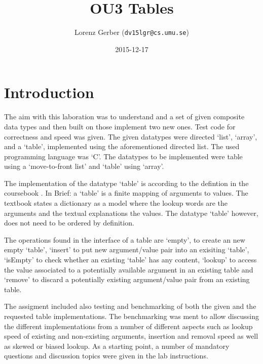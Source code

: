 \documentclass[a4paper,11pt,twoside]{article}
\title{OU3 Tables}
\author{Lorenz Gerber  ({\tt{dv15lgr@cs.umu.se}})}
\date{2015-12-17}
\begin{document}
\lstset{language=C}
\maketitle

\tableofcontents
\newpage

\section{Introduction} 
The aim with this laboration was to understand and a set of given 
composite data types and then built on those implement two new ones.
Test code for correctness and speed was given. The given datatypes
were directed `list', `array', and a `table', implemented using the 
aforementioned directed list. The used programming language was `C'. 
The datatypes to be implemented were table using a `move-to-front 
list' and `table' using `array'.

The implementation of the datatype `table' is according to the 
defintion in the coursebook \cite[pp. 117 -- 132]{janlert2000}. In Brief:
a `table' is a finite mapping of arguments to values. The textbook states 
a dictionary as a model where the lookup words are the arguments and the
textual explanations the values. The datatype `table' however, does not 
need to be ordered by definition.

The operations found in the interface of a table are `empty', to create
an new empty `table', `insert' to put new argument/value pair into an 
exisiting `table', `isEmpty' to check whether an existing `table' has any
content, `lookup' to access the value associated to a potentially available
argument in an existing table and `remove' to discard a potentially
existing argument/value pair from an existing table.  

The assigment included also testing and benchmarking of both the given and
the requested table implementations. The benchmarking was ment to
allow discussing the different implementations from a number of different
aspects such as lookup speed of existing and non-existing arguments, insertion
and removal speed as well as skewed or biased lookup. As a starting point,
a number of mandatory questions and discussion topics were given in the
lab instructions.  
\end{document}
